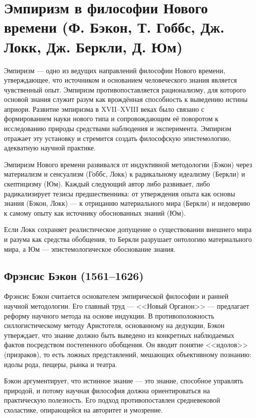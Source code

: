 \documentclass[12pt,a4paper]{article}
\begin{document}
	\section{Эмпиризм в философии Нового времени (Ф. Бэкон, Т. Гоббс, Дж. Локк, Дж. Беркли, Д. Юм)~\checkmark}
	
	Эмпиризм — одно из ведущих направлений философии Нового времени, утверждающее, что источником и основанием человеческого знания является чувственный опыт. Эмпиризм противопоставляется рационализму, для которого основой знания служит разум как врождённая способность к выведению истины априори. Развитие эмпиризма в XVII–XVIII веках было связано с формированием науки нового типа и сопровождающим её поворотом к исследованию природы средствами наблюдения и эксперимента. Эмпиризм отражает эту установку и стремится создать философскую эпистемологию, адекватную научной практике.
	
	\par Эмпиризм Нового времени развивался от индуктивной методологии (Бэкон) через материализм и сенсуализм (Гоббс, Локк) к радикальному идеализму (Беркли) и скептицизму (Юм). Каждый следующий автор либо развивает, либо радикализирует тезисы предшественника: от утверждения опыта как основы знания (Бэкон, Локк) — к отрицанию материального мира (Беркли) и недоверию к самому опыту как источнику обоснованных знаний (Юм).
	
	Если Локк сохраняет реалистическое допущение о существовании внешнего мира и разума как средства обобщения, то Беркли разрушает онтологию материального мира, а Юм — эпистемологическое обоснование знания.
	
	\subsection{Фрэнсис Бэкон (1561–1626)}
	Фрэнсис Бэкон считается основателем эмпирической философии и ранней научной методологии. Его главный труд — <<Новый Органон>> — предлагает реформу научного метода на основе индукции. В противоположность силлогистическому методу Аристотеля, основанному на дедукции, Бэкон утверждает, что знание должно быть выведено из конкретных наблюдаемых фактов посредством постепенного обобщения. Он вводит понятие <<идолов>> (призраков), то есть ложных представлений, мешающих объективному познанию: идолы рода, пещеры, рынка и театра.
	
	Бэкон аргументирует, что истинное знание — это знание, способное управлять природой, и потому научная философия должна ориентироваться на практическую полезность. Его подход противопоставлен средневековой схоластике, опирающейся на авторитет и умозрение.
	
\end{document}
